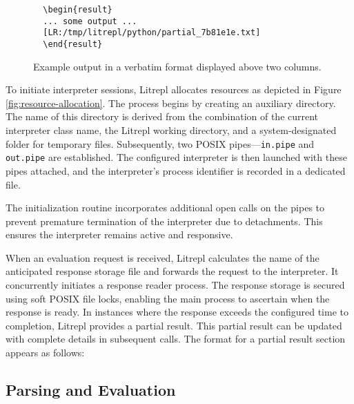 \documentclass[a4paper,12pt,twocolumn]{article}
\begin{document}
\begin{figure*}[hbt!]
  \centering
  \begin{minipage}{\textwidth}
  \begin{verbatim}
  \begin{result}
  ... some output ...
  [LR:/tmp/litrepl/python/partial_7b81e1e.txt]
  \end{result}
  \end{verbatim}
  \end{minipage}
  \caption{Example output in a verbatim format displayed above two columns.}
  \label{fig:verbatim_example}
\end{figure*}

To initiate interpreter sessions, Litrepl allocates resources as depicted in
Figure \ref{fig:resource-allocation}. The process begins by creating an
auxiliary directory. The name of this directory is derived from the combination
of the current interpreter class name, the Litrepl working directory, and a
system-designated folder for temporary files. Subsequently, two POSIX
pipes—\texttt{in.pipe} and \texttt{out.pipe} are established. The configured
interpreter is then launched with these pipes attached, and the interpreter's
process identifier is recorded in a dedicated file.

The initialization routine incorporates additional open calls on the pipes to
prevent premature termination of the interpreter due to detachments. This
ensures the interpreter remains active and responsive.

When an evaluation request is received, Litrepl calculates the name of the
anticipated response storage file and forwards the request to the interpreter.
It concurrently initiates a response reader process. The response storage is
secured using soft POSIX file locks, enabling the main process to ascertain when
the response is ready. In instances where the response exceeds the configured
time to completion, Litrepl provides a partial result. This partial result can
be updated with complete details in subsequent calls. The format for a partial
result section appears as follows:

\subsection{Parsing and Evaluation}
\end{document}
